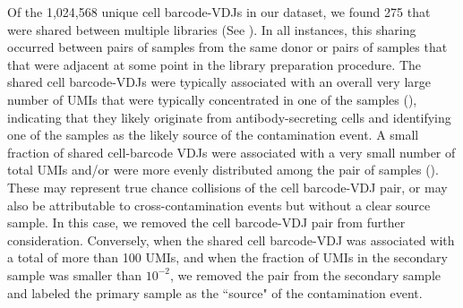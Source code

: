 Of the 1,024,568 unique cell barcode-VDJs in our dataset, we found 275 that were shared between multiple libraries (See ). In all instances, this sharing occurred between pairs of samples from the same donor or pairs of samples that that were adjacent at some point in the library preparation procedure. The shared cell barcode-VDJs were typically associated with an overall very large number of UMIs that were typically concentrated in one of the samples (), indicating that they likely originate from antibody-secreting cells and identifying one of the samples as the likely source of the contamination event. A small fraction of shared cell-barcode VDJs were associated with a very small number of total UMIs and/or were more evenly distributed among the pair of samples (). These may represent true chance collisions of the cell barcode-VDJ pair, or may also be attributable to cross-contamination events but without a clear source sample. In this case, we removed the cell barcode-VDJ pair from further consideration. Conversely, when the shared cell barcode-VDJ was associated with a total of more than 100 UMIs, and when the fraction of UMIs in the secondary sample was smaller than $10^{-2}$, we removed the pair from the secondary sample and labeled the primary sample as the ``source" of the contamination event.

